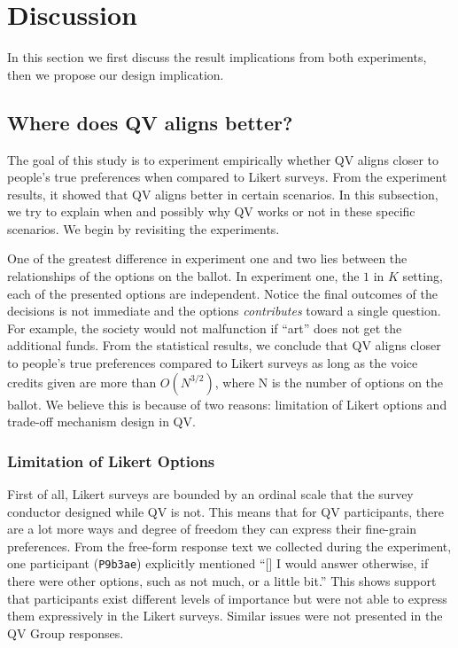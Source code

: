 \section{Discussion} \label{discussion}
In this section we first discuss the result implications from both experiments,
then we propose our design implication.

\subsection{Where does QV aligns better?}
The goal of this study is to 
experiment empirically whether
QV aligns closer to people's true preferences 
when compared to Likert surveys.
From the experiment results,
it showed that QV aligns better 
in certain scenarios.
In this subsection,
we try to explain when and possibly why
QV works or not in these specific scenarios.
We begin by revisiting the experiments.

One of the greatest difference
in experiment one and two
lies between the relationships of
the options on the ballot.
In experiment one,
the $1$ in $K$ setting,
each of the presented options
are independent.
Notice the final outcomes 
of the decisions
is not immediate and 
the options \textit{contributes}
toward a single question.
For example,
the society would not malfunction if ``art''
does not get the additional funds.
From the statistical results, we conclude that QV aligns closer to people's true preferences
compared to Likert surveys
as long as the voice credits given
are more than $O(N^{3/2})$, where N is the number of options on the ballot.
We believe this is because of two reasons:
limitation of Likert options and
trade-off mechanism design in QV.

\subsubsection{Limitation of Likert Options}
First of all, 
Likert surveys are bounded by an ordinal scale 
that the survey conductor designed while QV is not.
This means that 
for QV participants,
there are a lot more ways
and degree of freedom
they can express
their fine-grain preferences.
From the free-form response text we collected
during the experiment,
one participant (\texttt{P9b3ae}) explicitly mentioned ``[\textellipsis] I would answer otherwise, if there were other options, such as not much, or a little bit.''
This shows support that
participants exist different levels of importance 
but were not able to express them expressively 
in the Likert surveys.
Similar issues were not presented
in the QV Group responses.

